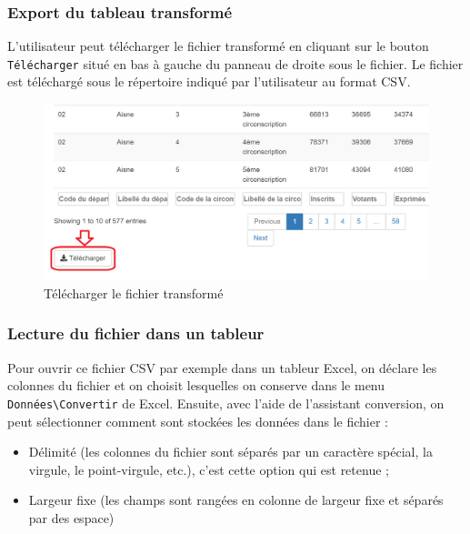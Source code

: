 \documentclass[
]{article}
\providecommand{\tightlist}{%
  \setlength{\itemsep}{0pt}\setlength{\parskip}{0pt}}
\begin{document}
\hypertarget{export-du-tableau-transformuxe9}{%
\subsubsection{Export du tableau
transformé}\label{export-du-tableau-transformuxe9}}

L'utilisateur peut télécharger le fichier transformé en cliquant sur le
bouton \texttt{Télécharger} situé en bas à gauche du panneau de droite
sous le fichier. Le fichier est téléchargé sous le répertoire indiqué
par l'utilisateur au format CSV.

\begin{figure}

{\centering \includegraphics[width=0.75\linewidth]{fig/telecharger_apres_transformation} 

}

\caption{Télécharger le fichier transformé}\label{fig:telecharger}
\end{figure}

\hypertarget{lecture-du-fichier-dans-un-tableur}{%
\subsubsection{Lecture du fichier dans un
tableur}\label{lecture-du-fichier-dans-un-tableur}}

Pour ouvrir ce fichier CSV par exemple dans un tableur Excel, on déclare
les colonnes du fichier et on choisit lesquelles on conserve dans le
menu \texttt{Données\textbackslash{}Convertir} de Excel. Ensuite, avec
l'aide de l'assistant conversion, on peut sélectionner comment sont
stockées les données dans le fichier :

\begin{itemize}
\tightlist
\item
  Délimité (les colonnes du fichier sont séparés par un caractère
  spécial, la virgule, le point-virgule, etc.), c'est cette option qui
  est retenue ;
\item
  Largeur fixe (les champs sont rangées en colonne de largeur fixe et
  séparés par des espace)
\end{itemize}
\end{document}
